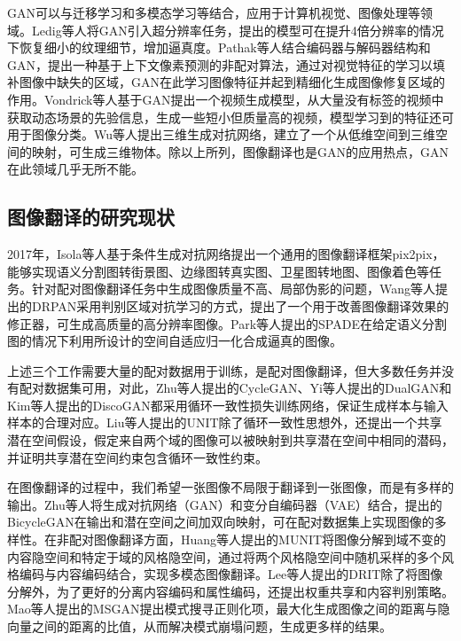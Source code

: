 GAN可以与迁移学习和多模态学习等结合，应用于计算机视觉、图像处理等领域。Ledig等人\cite{ledig2017photo}将GAN引入超分辨率任务，提出的模型可在提升4倍分辨率的情况下恢复细小的纹理细节，增加逼真度。Pathak等人\cite{pathak2016context}结合编码器与解码器结构和GAN，提出一种基于上下文像素预测的非配对算法，通过对视觉特征的学习以填补图像中缺失的区域，GAN在此学习图像特征并起到精细化生成图像修复区域的作用。Vondrick等人\cite{vondrick2016generating}基于GAN提出一个视频生成模型，从大量没有标签的视频中获取动态场景的先验信息，生成一些短小但质量高的视频，模型学习到的特征还可用于图像分类。Wu等人\cite{wu2016learning}提出三维生成对抗网络，建立了一个从低维空间到三维空间的映射，可生成三维物体。除以上所列，图像翻译也是GAN的应用热点，GAN在此领域几乎无所不能。

\subsection{图像翻译的研究现状}

2017年，Isola等人\cite{isola2017image}基于条件生成对抗网络提出一个通用的图像翻译框架pix2pix，能够实现语义分割图转街景图、边缘图转真实图、卫星图转地图、图像着色等任务。针对配对图像翻译任务中生成图像质量不高、局部伪影的问题，Wang等人\cite{wang2019discriminative}提出的DRPAN采用判别区域对抗学习的方式，提出了一个用于改善图像翻译效果的修正器，可生成高质量的高分辨率图像。Park等人\cite{park2019semantic}提出的SPADE在给定语义分割图的情况下利用所设计的空间自适应归一化合成逼真的图像。

上述三个工作需要大量的配对数据用于训练，是配对图像翻译，但大多数任务并没有配对数据集可用，对此，Zhu等人\cite{zhu2017unpaired}提出的CycleGAN、Yi等人\cite{yi2017dualgan}提出的DualGAN和Kim等人\cite{kim2017learning}提出的DiscoGAN都采用循环一致性损失训练网络，保证生成样本与输入样本的合理对应。Liu等人\cite{liu2017unsupervised}提出的UNIT除了循环一致性思想外，还提出一个共享潜在空间假设，假定来自两个域的图像可以被映射到共享潜在空间中相同的潜码，并证明共享潜在空间约束包含循环一致性约束。

在图像翻译的过程中，我们希望一张图像不局限于翻译到一张图像，而是有多样的输出。Zhu等人\cite{zhu2017toward}将生成对抗网络（GAN\cite{goodfellow2014generative}）和变分自编码器（VAE\cite{kingma2013auto}）结合，提出的BicycleGAN在输出和潜在空间之间加双向映射，可在配对数据集上实现图像的多样性。在非配对图像翻译方面，Huang等人\cite{huang2018multimodal}提出的MUNIT将图像分解到域不变的内容隐空间和特定于域的风格隐空间，通过将两个风格隐空间中随机采样的多个风格编码与内容编码结合，实现多模态图像翻译。Lee等人\cite{lee2018diverse}提出的DRIT除了将图像分解外，为了更好的分离内容编码和属性编码，还提出权重共享和内容判别策略。Mao等人\cite{mao2019mode}提出的MSGAN提出模式搜寻正则化项，最大化生成图像之间的距离与隐向量之间的距离的比值，从而解决模式崩塌问题，生成更多样的结果。

